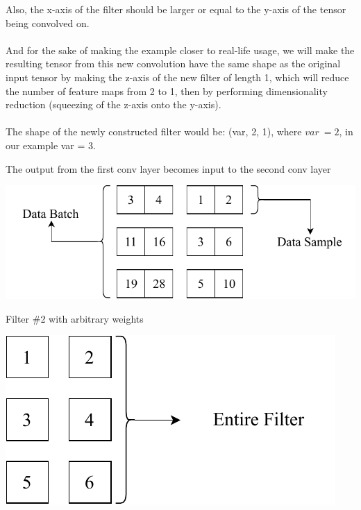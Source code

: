 \documentclass[12pt]{article}
\begin{document}
Also, the x-axis of the filter should be larger or equal to the y-axis of the tensor being convolved on.\\\\
And for the sake of making the example closer to real-life usage, we will make the resulting tensor from this new convolution have the same shape as the original input tensor by making the z-axis of the new filter of length 1, which will reduce the number of feature maps from 2 to 1, then by performing dimensionality reduction (squeezing of the z-axis onto the y-axis).\\\\
The shape of the newly constructed filter would be: (var, 2, 1), where $ var \>= 2 $, in our example var = 3.
\begin{blockfigure}{The output from the first conv layer becomes input to the second conv layer}
	\begin{center}
		\includegraphics[width=\textwidth]{secondinput_final}
	\end{center}
\end{blockfigure}
\begin{blockfigure}{Filter \#2 with arbitrary weights}
	\begin{center}
		\includegraphics[width=\textwidth]{filter2}
	\end{center}
\end{blockfigure}
\newpage
\end{document}
